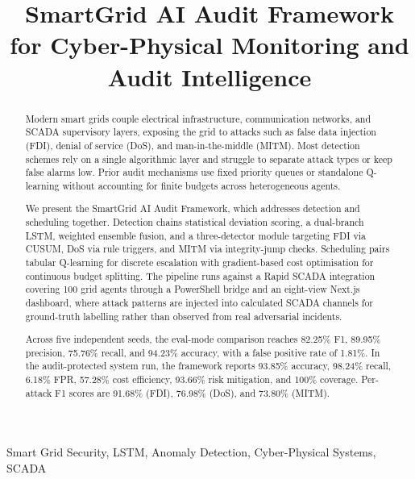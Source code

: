 \documentclass[conference,a4paper]{IEEEtran}
\begin{document}
\pagestyle{empty}

\title{SmartGrid AI Audit Framework for Cyber-Physical Monitoring and Audit Intelligence}

\author{
}

\maketitle

\begin{abstract}
Modern smart grids couple electrical infrastructure, communication networks, and SCADA supervisory layers, exposing the grid to attacks such as false data injection (FDI), denial of service (DoS), and man-in-the-middle (MITM). Most detection schemes rely on a single algorithmic layer and struggle to separate attack types or keep false alarms low. Prior audit mechanisms use fixed priority queues or standalone Q-learning without accounting for finite budgets across heterogeneous agents.

We present the SmartGrid AI Audit Framework, which addresses detection and scheduling together. Detection chains statistical deviation scoring, a dual-branch LSTM, weighted ensemble fusion, and a three-detector module targeting FDI via CUSUM, DoS via rule triggers, and MITM via integrity-jump checks. Scheduling pairs tabular Q-learning for discrete escalation with gradient-based cost optimisation for continuous budget splitting. The pipeline runs against a Rapid SCADA integration covering 100 grid agents through a PowerShell bridge and an eight-view Next.js dashboard, where attack patterns are injected into calculated SCADA channels for ground-truth labelling rather than observed from real adversarial incidents.

Across five independent seeds, the eval-mode comparison reaches 82.25\% F1, 89.95\% precision, 75.76\% recall, and 94.23\% accuracy, with a false positive rate of 1.81\%. In the audit-protected system run, the framework reports 93.85\% accuracy, 98.24\% recall, 6.18\% FPR, 57.28\% cost efficiency, 93.66\% risk mitigation, and 100\% coverage. Per-attack F1 scores are 91.68\% (FDI), 76.98\% (DoS), and 73.80\% (MITM).
\end{abstract}

\begin{IEEEkeywords}
Smart Grid Security, LSTM, Anomaly Detection, Cyber-Physical Systems, SCADA
\end{IEEEkeywords}
\end{document}

